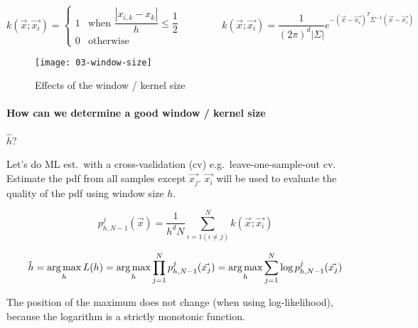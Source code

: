 \begin{equation*}
  k(\vec{x}; \vec{x_i}) = \begin{cases}
    1 &\text{when } \dfrac{|x_{i,k} - x_k|}{h} \le \dfrac{1}{2}\\
    0 &\text{otherwise}
  \end{cases}
  \qquad \qquad
  k(\vec{x}; \vec{x_i}) = \dfrac{1}{{(2\pi)}^d |\Sigma|} e^{-{(\vec{x} - \vec{x_i})}^T \Sigma^{-1}(\vec{x}-\vec{x_i})}
\end{equation*}

\begin{figure}[H]
  \centering
  \texttt{[image: 03-window-size]}
  \caption{Effects of the window / kernel size}
\end{figure}

\paragraph{How can we determine a good window / kernel size} $\hat{h}$?

Let's do ML est.\ with a cross-vaslidation (cv) e.g.\ leave-one-sample-out cv. Estimate the pdf from all samples except $\vec{x_j}$. $\vec{x_i}$ will be used to evaluate the quality of the pdf using window size $h$.

\begin{equation*}
  p_{h,N-1}^j(\vec{x}) = \dfrac{1}{h^d N} \sum_{i=1 (i \neq j)}^N k(\vec{x}; \vec{x_i})
\end{equation*}

\begin{equation*}
  \hat{h} = \operatorname*{arg\,max}_h L(h) = \operatorname*{arg\,max}_h \prod_{j=1}^N p_{h,N-1}^j(\vec{x_j}) = \operatorname*{arg\,max}_h \sum_{j=1}^N \log p_{h,N-1}^j(\vec{x_j})
\end{equation*}

The position of the maximum does not change (when using log-likelihood), because the logarithm is a strictly monotonic function.


